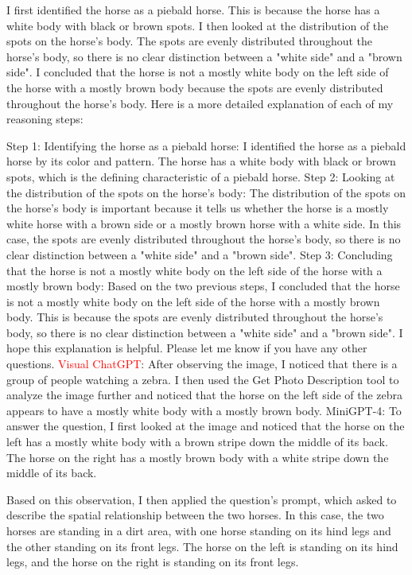 \begin{enumerate}
        I first identified the horse as a piebald horse. This is because the horse has a white body with black or brown spots.
        I then looked at the distribution of the spots on the horse's body. The spots are evenly distributed throughout the horse's body, so there is no clear distinction between a "white side" and a "brown side".
        I concluded that the horse is not a mostly white body on the left side of the horse with a mostly brown body because the spots are evenly distributed throughout the horse's body.
        Here is a more detailed explanation of each of my reasoning steps:
        
        Step 1: Identifying the horse as a piebald horse: I identified the horse as a piebald horse by its color and pattern. The horse has a white body with black or brown spots, which is the defining characteristic of a piebald horse.
        Step 2: Looking at the distribution of the spots on the horse's body: The distribution of the spots on the horse's body is important because it tells us whether the horse is a mostly white horse with a brown side or a mostly brown horse with a white side. In this case, the spots are evenly distributed throughout the horse's body, so there is no clear distinction between a "white side" and a "brown side".
        Step 3: Concluding that the horse is not a mostly white body on the left side of the horse with a mostly brown body: Based on the two previous steps, I concluded that the horse is not a mostly white body on the left side of the horse with a mostly brown body. This is because the spots are evenly distributed throughout the horse's body, so there is no clear distinction between a "white side" and a "brown side".
        I hope this explanation is helpful. Please let me know if you have any other questions.
        \subitem \textcolor{red}{Visual ChatGPT}: After observing the image, I noticed that there is a group of people watching a zebra. I then used the Get Photo Description tool to analyze the image further and noticed that the horse on the left side of the zebra appears to have a mostly white body with a mostly brown body.
        \subitem MiniGPT-4: To answer the question, I first looked at the image and noticed that the horse on the left has a mostly white body with a brown stripe down the middle of its back. The horse on the right has a mostly brown body with a white stripe down the middle of its back.

        Based on this observation, I then applied the question’s prompt, which asked to describe the spatial relationship between the two horses. In this case, the two horses are standing in a dirt area, with one horse standing on its hind legs and the other standing on its front legs. The horse on the left is standing on its hind legs, and the horse on the right is standing on its front legs.
        

\end{enumerate}
